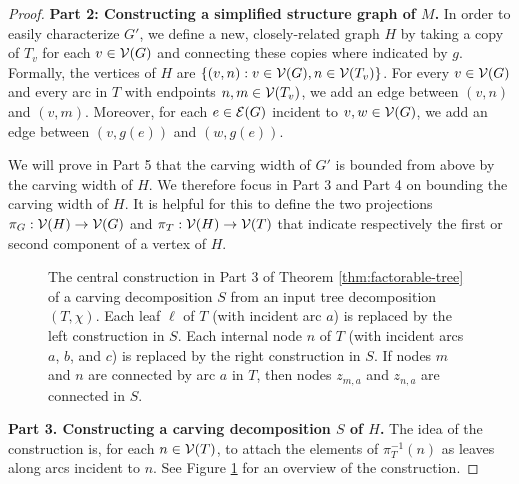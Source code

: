 \begin{proof}
\textbf{Part 2: Constructing a simplified structure graph of $M$.} In order to easily characterize $G'$, we define a new, closely-related graph $H$ by taking a copy of $T_v$ for each $v \in \mathcal{V}(G)$ and connecting these copies where indicated by $g$. Formally, the vertices of $H$ are $\{(v, n) : v \in \mathcal{V}(G), n \in \mathcal{V}(T_v)\}$. For every $v \in \mathcal{V}(G)$ and every arc in $T$ with endpoints $n, m \in \mathcal{V}(T_v)$, we add an edge between $(v, n)$ and $(v, m)$. Moreover, for each $e \in \mathcal{E}(G)$ incident to $v, w \in \mathcal{V}(G)$, we add an edge between $(v, g(e))$ and $(w, g(e))$. 

We will prove in Part 5 that the carving width of $G'$ is bounded from above by the carving width of $H$. We therefore focus in Part 3 and Part 4 on bounding the carving width of $H$. It is helpful for this to define the two projections $\pi_G : \mathcal{V}(H) \rightarrow \mathcal{V}(G)$ and $\pi_T : \mathcal{V}(H) \rightarrow \mathcal{V}(T)$ that indicate respectively the first or second component of a vertex of $H$. 



\begin{figure}[t]
	\centering
	
	\caption{\label{fig:factor-carving-construction} The central construction in Part 3 of Theorem \ref{thm:factorable-tree} of a carving decomposition $S$ from an input tree decomposition $(T, \chi)$. Each leaf $\ell$ of $T$ (with incident arc $a$) is replaced by the left construction in $S$. Each internal node $n$ of $T$ (with incident arcs $a$, $b$, and $c$) is replaced by the right construction in $S$. If nodes $m$ and $n$ are connected by arc $a$ in $T$, then nodes $z_{m,a}$ and $z_{n,a}$ are connected in $S$.}
\end{figure}

\textbf{Part 3. Constructing a carving decomposition $S$ of $H$.}
The idea of the construction is, for each $n \in \mathcal{V}(T)$, to attach the elements of $\pi_T^{-1}(n)$ as leaves along arcs incident to $n$. See Figure \ref{fig:factor-carving-construction} for an overview of the construction.


\end{proof}
